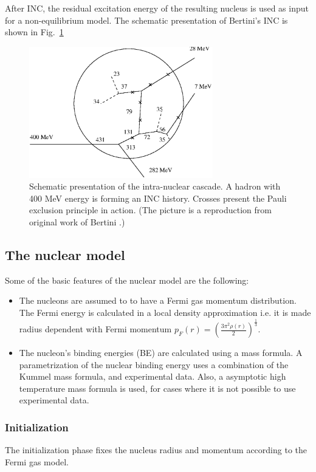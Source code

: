 \documentclass[twocolumn,twoside,slac,floatfix]{revtex4}
\begin{document}
After INC, the residual excitation energy of the resulting nucleus is used as input for a non-equilibrium model. The schematic presentation of Bertini's INC is shown in Fig.~\ref{figMC}


\begin{figure}
  \includegraphics[width=80mm,keepaspectratio]{mc.eps}
  \caption{Schematic presentation of the intra-nuclear cascade. A hadron with 400 MeV energy is forming an INC history. Crosses present the Pauli exclusion principle in action. (The picture is a reproduction from original work of Bertini \cite{bertini68}.)}
  \label{figMC}
\end{figure}



\subsection{The nuclear model}

Some of the basic features of the nuclear model are the following:

\begin{itemize}
\item The nucleons are assumed to to have a Fermi gas momentum distribution. 
The Fermi energy is calculated in a local density approximation i.e. 
it is made radius dependent with Fermi momentum $p_{F}(r) = (\frac{3 \pi^2 \rho(r)}{2})^\frac{1}{3}$.
\item The nucleon's binding energies (BE) are calculated using a mass formula.
A parametrization of the nuclear binding energy uses a combination of the Kummel mass formula, and
experimental data. Also, a asymptotic high temperature mass formula is used, 
for cases where it is not possible to use experimental data.
\end{itemize}

\subsubsection{Initialization}
The initialization phase fixes the nucleus radius  and momentum according to the Fermi gas model.
\end{document}
